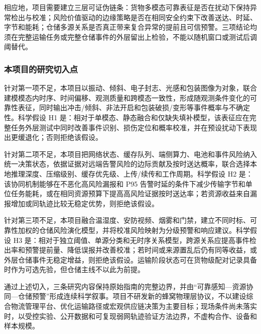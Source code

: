 相应地，项目需要建立三层可证伪链条：货物多模态可靠表征是否在扰动下保持异常检出与校准；风险价值驱动的边缘策略是否在相同安全约束下改善送达、时延、字节和能耗；仓储多源关系是否真正带来复合异常的提前且可信预警。三项结论均须在完整运输任务或完整仓储事件的外层留出上检验，不能以随机窗口或测试后调阈替代。

\subsubsection{本项目的研究切入点}

针对第一项不足，本项目以振动、倾斜、电子封志、光感和包装图像为对象，联合建模模态内时序、时间偏移、观测质量和跨模态一致性，形成随观测条件变化的可靠性表征，同时输出冲击/倾斜、非法开启和包装破损/变形等事件概率与不确定性。科学假设 H1 是：相对于单模态、静态融合和仅缺失填补模型，该表征应在完整任务外层测试中同时改善事件识别、损伤定位和概率校准，并在预设扰动下表现出更缓退化；否则拒绝该假设。

针对第二项不足，本项目把网络状态、缓存队列、端侧算力、电池和事件风险纳入统一决策状态，依据证据对远端告警风险的边际贡献及按时送达概率，联合选择本地推理深度、压缩级别、缓存优先级、上传/续传和工作周期。科学假设 H2 是：该协同机制能够在不恶化高风险漏报和 P95 告警时延的条件下减少传输字节和单位任务能耗，或在相同资源预算下提高高风险证据按时送达率；若资源收益来自漏报增加或同轨迹比较无稳定优势，则拒绝该假设。

针对第三项不足，本项目融合温湿度、安防视频、烟雾和门禁，建立不同时标、可靠性加权的仓储风险演化模型，并将校准风险映射为分级预警和响应建议。科学假设 H3 是：相对于独立阈值、单源分类和无时序关系模型，跨源关系应提高事件检出率和预警提前量、降低误报并改善校准；若时间或来源置乱后仍有同等收益，或外层仓储事件无稳定增益，则拒绝该假设。运输阶段状态可在货物级配对记录具备时作为可选先验，但仓储主线不以此为前提。

通过上述切入，三条研究内容保持原始指南的完整边界，并由“可靠感知—资源协同—仓储预警”形成连续科学叙事。项目不研发新的蜂窝物理层协议，不以建设综合物流管理平台、优化运输路径或宏观供应链决策为主要目标；现场条件尚未落实时，以受控实验、公开数据和可复现弱网轨迹验证方法边界，不虚构合作、设备和样本规模。

